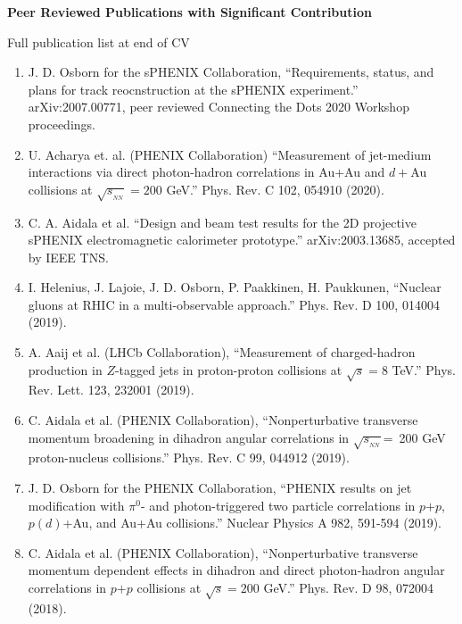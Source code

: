\documentclass[11pt]{article}
\begin{document}
\begin{flushleft}
\Large\textbf{Peer Reviewed Publications with Significant Contribution}
\vspace{4pt}

\small 
Full publication list at end of CV
\begin{center}
\normalsize
\begin{enumerate}
	\item J. D. Osborn for the sPHENIX Collaboration, ``Requirements, status, and plans for track reocnstruction at the sPHENIX experiment.'' arXiv:2007.00771, peer reviewed Connecting the Dots 2020 Workshop proceedings.
	
	\item U. Acharya et. al. (PHENIX Collaboration) ``Measurement of jet-medium interactions via direct photon-hadron correlations in Au+Au and $d+$Au collisions at $\sqrt{s_{_{NN}}}=200$ GeV.'' Phys. Rev. C 102, 054910 (2020).
	
	\item C. A. Aidala et al. ``Design and beam test results for the 2D projective sPHENIX electromagnetic calorimeter prototype.'' arXiv:2003.13685, accepted by IEEE TNS.
	
	\item I. Helenius, J. Lajoie, J. D. Osborn, P. Paakkinen, H. Paukkunen, ``Nuclear gluons at RHIC in a multi-observable approach.'' Phys. Rev. D 100, 014004 (2019).
	
	\item A. Aaij et al. (LHCb Collaboration), ``Measurement of charged-hadron production in $Z$-tagged jets in proton-proton collisions at $\sqrt{s}=8$ TeV.'' Phys. Rev. Lett. 123, 232001 (2019).
	
	\item C. Aidala et al. (PHENIX Collaboration), ``Nonperturbative transverse momentum broadening in dihadron angular correlations in $\sqrt{s_{_{NN}}}$=~200 GeV proton-nucleus collisions.''  Phys. Rev. C 99, 044912 (2019).

	\item J. D. Osborn for the PHENIX Collaboration, ``PHENIX results on jet modification with $\pi^0$- and photon-triggered two particle correlations in $p$$+$$p$, $p(d)$+Au, and Au+Au collisions.'' Nuclear Physics A 982, 591-594 (2019).

	\item C. Aidala et al. (PHENIX Collaboration), ``Nonperturbative transverse momentum dependent effects in dihadron and direct photon-hadron angular correlations in $p$$+$$p$ collisions at $\sqrt{s}=200$ GeV.'' Phys. Rev. D 98, 072004 (2018).
		

\end{enumerate}
\end{center}
\end{flushleft}
\end{document}
